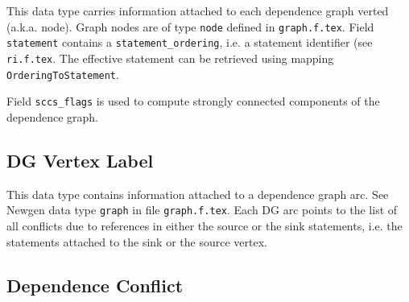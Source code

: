\documentclass[a4paper]{article}
\begin{document}
{}

This data type carries information attached to each dependence graph
verted (a.k.a. node). Graph nodes are of type \verb/node/ defined in
{\tt graph.f.tex}.  Field \verb/statement/ contains a
\verb/statement_ordering/, i.e. a statement identifier (see {\tt
ri.f.tex}. The effective statement can be retrieved using mapping
\verb/OrderingToStatement/.

Field \verb/sccs_flags/ is used to compute strongly connected components
of the dependence graph.

\begin{comment}
Ce domaine est utilise' pour contenir les informations qui sont
attache'es a` chaque noeud du graphe de de'pendances (voir le domaine
{\tt graph} dans le fichier {\tt graph.f.tex}). Le sous-domaine {\tt
statement} permet de retrouver l'instruction qui porte la de'pendance;
cet entier est le champ {\tt ordering} de l'instruction concerne'e. Le
sous-domaine {\tt sccflags} contient diverses informations utiles pour
le calcul des composantes fortement connexes.
\end{comment}

\subsection{DG Vertex Label}

{}

This data type contains information attached to a dependence graph arc.
See Newgen data type \verb/graph/ in file \verb/graph.f.tex/. Each DG arc
points to the list of all conflicts due to references in either the
source or the sink statements, i.e. the statements attached to the sink
or the source vertex.

\begin{comment}
Ce domaine est utilise' pour contenir les informations qui sont
attache'es a` chaque arc du graphe de de'pendances (voir le domaine {\tt
graph} dans le fichier {\tt graph.f.tex}). Chaque arc du GD contient les
conflits entre les deux statements des noeuds du graphe de de'pendance.
\end{comment}

\subsection{Dependence Conflict}

{}
\end{document}
